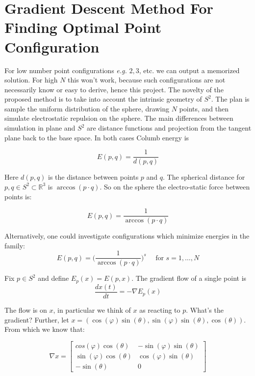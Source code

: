 \documentclass[10pt]{article}
\begin{document}
\section*{Gradient Descent Method For Finding Optimal Point Configuration}

For low number point configurations \textit{e.g.} $2, 3$, etc. we can output a memorized solution. For high $N$ this won't work, because such configurations are not necessarily know or easy to derive, hence this project. The novelty of the proposed method is to take into account the intrinsic geometry of $S^2$. The plan is sample the uniform distribution of the sphere, drawing $N$ points, and then simulate electrostatic repulsion on the sphere. The main differences between simulation in plane and $S^2$ are distance functions and projection from the tangent plane back to the base space. In both cases Columb energy is

\[
		E(p,q) = \frac{1}{d(p,q)}
\]

Here $d(p,q)$ is the distance between points $p$ and $q$. The spherical distance for $p, q \in S^2 \subset \mathbb{R}^3$ is $\arccos(p \cdot q)$. So on the sphere the electro-static force between points is:

\[
	E(p,q) = \frac{1}{\arccos(p \cdot q)}
\]

Alternatively, one could investigate configurations which minimize energies in the family:
\[
		E(p,q) = \Big( \frac{1}{\arccos(p \cdot q)}  \Big)^s \quad \text{ for } s= 1, \ldots, N
\]

Fix $p \in S^2$ and define $E_p(x) = E(p,x)$. The gradient flow of a single point is 
\[
	\frac{dx(t)}{dt} = - \nabla E_p(x)
\]


The flow is on $x$, in particular we think of $x$ as reacting to $p$. What's the gradient?  Further, let $x = (\cos(\varphi) \sin(\theta), \sin(\varphi)\sin(\theta), \cos(\theta))$. From which we know that:

\[
\nabla x = 
\left[
	\begin{array}{cc}
		cos(\varphi) \cos(\theta) & -\sin(\varphi) \sin(\theta) \\
		  \sin(\varphi)\cos(\theta) & \cos(\varphi)\sin(\theta)  \\
		-\sin(\theta) & 0 
	\end{array}
	\right]
\]
\end{document}
